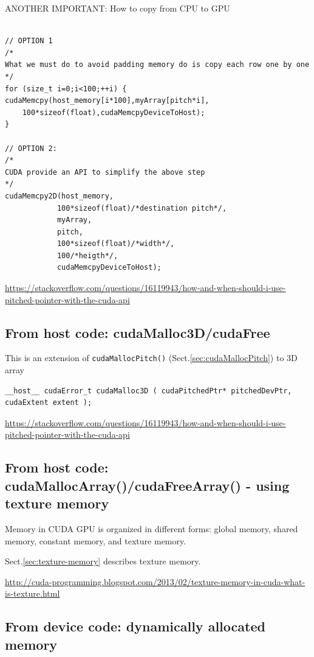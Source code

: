 ANOTHER IMPORTANT: How to copy from CPU to GPU
\begin{lstlisting}

// OPTION 1
/*
What we must do to avoid padding memory do is copy each row one by one
*/
for (size_t i=0;i<100;++i) {
cudaMemcpy(host_memory[i*100],myArray[pitch*i],
    100*sizeof(float),cudaMemcpyDeviceToHost);
}

// OPTION 2:
/*
CUDA provide an API to simplify the above step
*/
cudaMemcpy2D(host_memory,
            100*sizeof(float)/*destination pitch*/,
            myArray,
            pitch,
            100*sizeof(float)/*width*/,
            100/*heigth*/,
            cudaMemcpyDeviceToHost);
\end{lstlisting}

\url{https://stackoverflow.com/questions/16119943/how-and-when-should-i-use-pitched-pointer-with-the-cuda-api}

\subsection{From host code: cudaMalloc3D/cudaFree}
\label{sec:cudaMalloc3D}

This is an extension of \verb!cudaMallocPitch()! (Sect.\ref{sec:cudaMallocPitch}) 
to 3D array

\begin{verbatim}
__host__ ​cudaError_t cudaMalloc3D ( cudaPitchedPtr* pitchedDevPtr, cudaExtent extent );
\end{verbatim}

\url{https://stackoverflow.com/questions/16119943/how-and-when-should-i-use-pitched-pointer-with-the-cuda-api}

\subsection{From host code: cudaMallocArray()/cudaFreeArray() - using texture memory}
\label{sec:cudaMallocArray}

Memory in CUDA GPU is organized in different forms:
global memory, shared memory, constant memory, and texture memory. 

Sect.\ref{sec:texture-memory} describes texture memory.


\url{http://cuda-programming.blogspot.com/2013/02/texture-memory-in-cuda-what-is-texture.html} 

\subsection{From device code: dynamically allocated memory}

